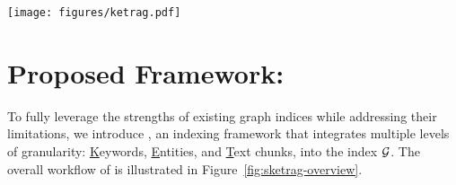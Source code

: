 
\begin{figure*}[!t]
    \centering
    \texttt{[image: figures/ketrag.pdf]}
    \vspace{-9mm}
    \caption{The illustration of \sketrag: the indexing stage in \textcircled{1}-\textcircled{3} and the retrieval stage in \textcircled{4}-\textcircled{5}.}
    \label{fig:sketrag-overview}
    \vspace{-2mm}
\end{figure*}

\section{Proposed Framework: \sketrag}
To fully leverage the strengths of existing graph indices while addressing their limitations, we introduce \sketrag, an indexing framework that integrates multiple levels of granularity: \underline{K}eywords, \underline{E}ntities, and \underline{T}ext chunks, into the \textgraph{} index $\mathcal{G}$. The overall workflow of \sketrag is illustrated in Figure~\ref{fig:sketrag-overview}.

